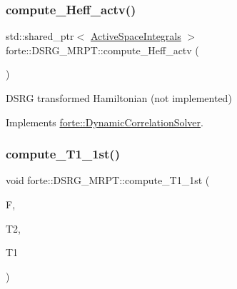 \mbox{\label{classforte_1_1_d_s_r_g___m_r_p_t_a929556373e50b9baeefbdd461fd72124}} 
\subsubsection{\texorpdfstring{compute\+\_\+\+Heff\+\_\+actv()}{compute\_Heff\_actv()}}
{\footnotesize\ttfamily std\+::shared\+\_\+ptr$<$ \mbox{\hyperlink{classforte_1_1_active_space_integrals}{Active\+Space\+Integrals}} $>$ forte\+::\+D\+S\+R\+G\+\_\+\+M\+R\+P\+T\+::compute\+\_\+\+Heff\+\_\+actv (\begin{DoxyParamCaption}{ }\end{DoxyParamCaption})\hspace{0.3cm}{\ttfamily [virtual]}}



D\+S\+RG transformed Hamiltonian (not implemented) 



Implements \mbox{\hyperlink{classforte_1_1_dynamic_correlation_solver_a8a66ab912dd2c7c1d35c1428df5a494d}{forte\+::\+Dynamic\+Correlation\+Solver}}.

\mbox{\label{classforte_1_1_d_s_r_g___m_r_p_t_a886819be6edca8bb76c94dd45fa6dd04}} 
\subsubsection{\texorpdfstring{compute\+\_\+\+T1\+\_\+1st()}{compute\_T1\_1st()}}
{\footnotesize\ttfamily void forte\+::\+D\+S\+R\+G\+\_\+\+M\+R\+P\+T\+::compute\+\_\+\+T1\+\_\+1st (\begin{DoxyParamCaption}\item[{Blocked\+Tensor \&}]{F,  }\item[{Blocked\+Tensor \&}]{T2,  }\item[{Blocked\+Tensor \&}]{T1 }\end{DoxyParamCaption})\hspace{0.3cm}{\ttfamily [protected]}}



